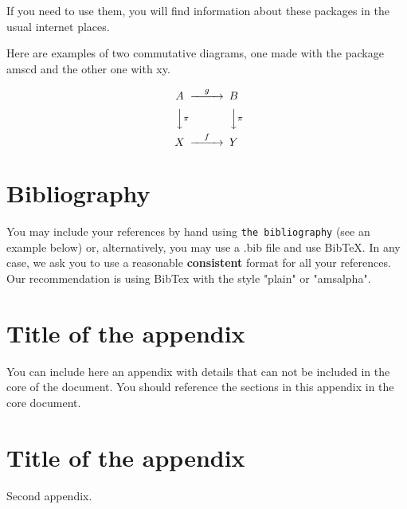 \documentclass[12,twoside]{TFG-GM}
\theoremstyle{definition}
\theoremstyle{remark}
\begin{document}
If you need to use them, you will find information about these packages in the usual internet places. 

Here are examples of two commutative diagrams, one made with the package amscd and the other one with xy.

\[
\begin{CD}
A @>g>> B\\
@VV\pi V @VV\pi V\\
X @>f>> Y
\end{CD}
\]


\section{Bibliography}

You may include your references by hand using {\tt the bibliography} (see an example below) or, alternatively, you may use a .bib file and use BibTeX. In any case, we ask you to use a reasonable {\bf consistent} format for all your references. Our recommendation is using BibTex with the style   "plain" or "amsalpha".


{}


\appendix
\vfill\newpage \section{Title of the appendix}
You can include here an appendix with details that can not be included in the core of the document. You should reference the sections in this appendix in the core document.
\vfill\newpage \section{Title of the appendix}
Second appendix.
\end{document}
